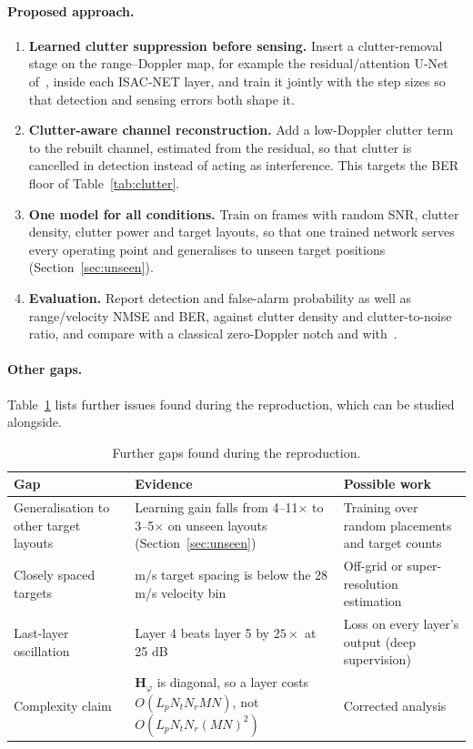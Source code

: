 \documentclass[11pt,a4paper]{article}
\newcommand{\BH}{\mathbf{H}}
\begin{document}
\paragraph{Proposed approach.}
\begin{enumerate}
  \item \textbf{Learned clutter suppression before sensing.} Insert a clutter-removal stage on the range--Doppler map, for example the residual/attention U-Net of~\cite{clutter}, inside each ISAC-NET layer, and train it jointly with the step sizes so that detection and sensing errors both shape it.
  \item \textbf{Clutter-aware channel reconstruction.} Add a low-Doppler clutter term to the rebuilt channel, estimated from the residual, so that clutter is cancelled in detection instead of acting as interference. This targets the BER floor of Table~\ref{tab:clutter}.
  \item \textbf{One model for all conditions.} Train on frames with random SNR, clutter density, clutter power and target layouts, so that one trained network serves every operating point and generalises to unseen target positions (Section~\ref{sec:unseen}).
  \item \textbf{Evaluation.} Report detection and false-alarm probability as well as range/velocity NMSE and BER, against clutter density and clutter-to-noise ratio, and compare with a classical zero-Doppler notch and with~\cite{clutter}.
\end{enumerate}

\paragraph{Other gaps.} Table~\ref{tab:gaps} lists further issues found during the reproduction, which can be studied alongside.

\begin{table}[H]
\centering\small
\begin{tabularx}{\textwidth}{>{\raggedright\arraybackslash}p{3.6cm}>{\raggedright\arraybackslash}X>{\raggedright\arraybackslash}p{4.2cm}}
\toprule
Gap & Evidence & Possible work \\
\midrule
Generalisation to other target layouts & Learning gain falls from 4--11$\times$ to 3--5$\times$ on unseen layouts (Section~\ref{sec:unseen}) & Training over random placements and target counts \\
Closely spaced targets & 5 m/s target spacing is below the 28 m/s velocity bin & Off-grid or super-resolution estimation \\
Last-layer oscillation & Layer 4 beats layer 5 by $25\times$ at 25 dB & Loss on every layer's output (deep supervision) \\
Complexity claim & $\BH_\varphi$ is diagonal, so a layer costs $O(L_pN_tN_rMN)$, not $O(L_pN_tN_r(MN)^2)$ & Corrected analysis \\
\bottomrule
\end{tabularx}
\caption{Further gaps found during the reproduction.}
\label{tab:gaps}
\end{table}
\end{document}
